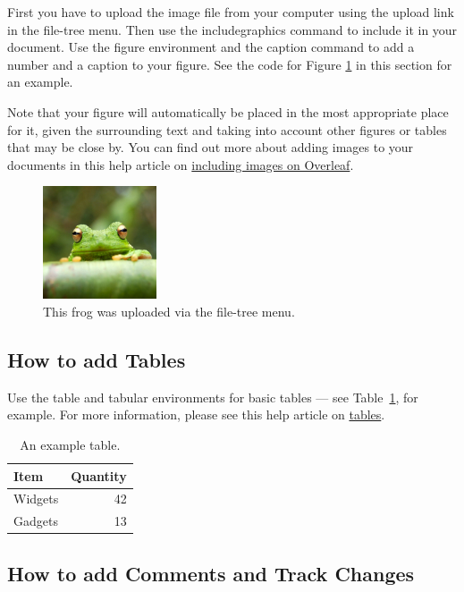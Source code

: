 \documentclass[twoside, 12pt]{book}
\begin{document}
\begin{enumerate}[label=\alph*)]
        First you have to upload the image file from your computer using the upload link in the file-tree menu. Then use the includegraphics command to include it in your document. Use the figure environment and the caption command to add a number and a caption to your figure. See the code for Figure \ref{fig:frog} in this section for an example.

Note that your figure will automatically be placed in the most appropriate place for it, given the surrounding text and taking into account other figures or tables that may be close by. You can find out more about adding images to your documents in this help article on \href{https://www.overleaf.com/learn/how-to/Including_images_on_Overleaf}{including images on Overleaf}.

\begin{figure}
\centering
\includegraphics[width=0.3\textwidth]{Images/frog.jpg}
\caption{\label{fig:frog}This frog was uploaded via the file-tree menu.}
\end{figure}

\subsection{How to add Tables}

Use the table and tabular environments for basic tables --- see Table~\ref{tab:widgets}, for example. For more information, please see this help article on \href{https://www.overleaf.com/learn/latex/tables}{tables}. 

\begin{table}
\centering
\begin{tabular}{l|r}
Item & Quantity \\\hline
Widgets & 42 \\
Gadgets & 13
\end{tabular}
\caption{\label{tab:widgets}An example table.}
\end{table}

\subsection{How to add Comments and Track Changes}


\end{enumerate}
\end{document}
